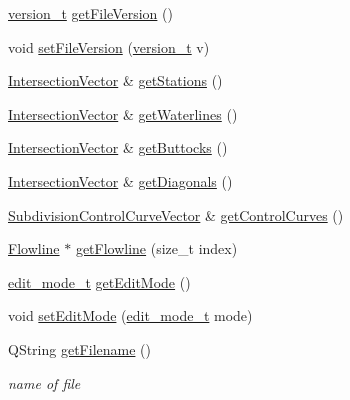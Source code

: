 \begin{DoxyCompactItemize}
\hyperlink{namespaceShipCAD_af3a6fa23a7318acbda7b0066b53d694f}{version\-\_\-t} \hyperlink{classShipCAD_1_1ShipCADModel_a17ecfdd29efc03ed2580b89f5da955c8}{get\-File\-Version} ()
\item 
void \hyperlink{classShipCAD_1_1ShipCADModel_a44ac7a48c0c01cae73bf723120071e72}{set\-File\-Version} (\hyperlink{namespaceShipCAD_af3a6fa23a7318acbda7b0066b53d694f}{version\-\_\-t} v)
\item 
\hyperlink{namespaceShipCAD_a9910f0963197f9df6125398efd4fa139}{Intersection\-Vector} \& \hyperlink{classShipCAD_1_1ShipCADModel_a86da3ca66e90403ead21ccc67f584c52}{get\-Stations} ()
\item 
\hyperlink{namespaceShipCAD_a9910f0963197f9df6125398efd4fa139}{Intersection\-Vector} \& \hyperlink{classShipCAD_1_1ShipCADModel_a6c147a75fa02e43145de346efb9542fd}{get\-Waterlines} ()
\item 
\hyperlink{namespaceShipCAD_a9910f0963197f9df6125398efd4fa139}{Intersection\-Vector} \& \hyperlink{classShipCAD_1_1ShipCADModel_a8908d7adff0b1aa1ed118103c02c5402}{get\-Buttocks} ()
\item 
\hyperlink{namespaceShipCAD_a9910f0963197f9df6125398efd4fa139}{Intersection\-Vector} \& \hyperlink{classShipCAD_1_1ShipCADModel_a19864f7628c596553f7c89247715b10a}{get\-Diagonals} ()
\item 
\hyperlink{namespaceShipCAD_aa9dd7a826ae5254e377dac43ea19da80}{Subdivision\-Control\-Curve\-Vector} \& \hyperlink{classShipCAD_1_1ShipCADModel_ac631aaf60a936bb5b22bcab59cb7d6a4}{get\-Control\-Curves} ()
\item 
\hyperlink{classShipCAD_1_1Flowline}{Flowline} $\ast$ \hyperlink{classShipCAD_1_1ShipCADModel_afc5654f671a17dd6672230648842975e}{get\-Flowline} (size\-\_\-t index)
\item 
\hyperlink{namespaceShipCAD_a66144e3f3a53da01f51c9bdb94fcae31}{edit\-\_\-mode\-\_\-t} \hyperlink{classShipCAD_1_1ShipCADModel_a355525c21cd0a9a4a88846b5587a236c}{get\-Edit\-Mode} ()
\item 
void \hyperlink{classShipCAD_1_1ShipCADModel_a2636160d900b8d8b00802ae78ee87925}{set\-Edit\-Mode} (\hyperlink{namespaceShipCAD_a66144e3f3a53da01f51c9bdb94fcae31}{edit\-\_\-mode\-\_\-t} mode)
\item 
Q\-String \hyperlink{classShipCAD_1_1ShipCADModel_a7cdd359f050f81975d1992a7d161ce87}{get\-Filename} ()
\begin{DoxyCompactList}\small\item\em name of file \end{DoxyCompactList}\item 

\end{DoxyCompactItemize}
